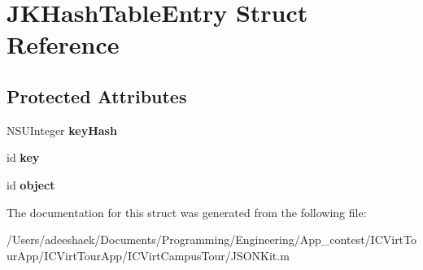 \hypertarget{struct_j_k_hash_table_entry}{\section{J\-K\-Hash\-Table\-Entry Struct Reference}
\label{struct_j_k_hash_table_entry}
}
\subsection*{Protected Attributes}
\begin{DoxyCompactItemize}
\item 
\hypertarget{struct_j_k_hash_table_entry_aa47e5f520c605d626894b4936da27dd2}{N\-S\-U\-Integer {\bfseries key\-Hash}}\label{struct_j_k_hash_table_entry_aa47e5f520c605d626894b4936da27dd2}

\item 
\hypertarget{struct_j_k_hash_table_entry_a3f66824ea36efcec0ee4a526e8bafe65}{id {\bfseries key}}\label{struct_j_k_hash_table_entry_a3f66824ea36efcec0ee4a526e8bafe65}

\item 
\hypertarget{struct_j_k_hash_table_entry_a0d2bb04646dae94e58a3d0392a0c37f2}{id {\bfseries object}}\label{struct_j_k_hash_table_entry_a0d2bb04646dae94e58a3d0392a0c37f2}

\end{DoxyCompactItemize}


The documentation for this struct was generated from the following file\-:\begin{DoxyCompactItemize}
\item 
/\-Users/adeeshaek/\-Documents/\-Programming/\-Engineering/\-App\-\_\-contest/\-I\-C\-Virt\-Tour\-App/\-I\-C\-Virt\-Tour\-App/\-I\-C\-Virt\-Campus\-Tour/J\-S\-O\-N\-Kit.\-m\end{DoxyCompactItemize}
